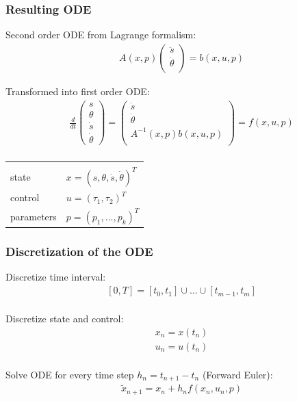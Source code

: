 \begin{frame}[c]
	\frametitle{Resulting ODE}
	
	Second order ODE from Lagrange formalism:
	\begin{align*}
	  &A(x,p)
	  \begin{pmatrix} 
	    \ddot{s} \\ \ddot{\theta} \\
	  \end{pmatrix}
	  = b(x,u,p)
	\end{align*}
	
	Transformed into first order ODE:
	\begin{align*}
	  &\frac{d}{dt}
	  \begin{pmatrix}
	  s \\ \theta \\ \dot{s} \\ \dot{\theta}
	  \end{pmatrix}
	  =
	  \begin{pmatrix}
	    \dot{s} \\ \dot{\theta} \\ A^{-1}(x,p)b(x,u,p) \\
	  \end{pmatrix} 
	  = f(x,u,p) \\
	\end{align*}
	
	\vspace{-1.0cm}
	
	\begin{tabular}{ll}
	  & \\
	  state & $ x = (s,\theta,\dot{s},\dot{\theta})^T $ \\
	  control & $ u = (\tau_1,\tau_2)^T $ \\
	  parameters & $ p = (p_1,...,p_k)^T $ \\
	\end{tabular}
\end{frame}

\begin{frame}
	\frametitle{Discretization of the ODE}
	
	Discretize time interval:
	\begin{align*}
	  &[0,T] = [t_0,t_1] \cup \ldots \cup [t_{m-1},t_m] \\
	\end{align*}
	
	Discretize state and control:
	\begin{align*}
	  &x_n = x(t_n) \\
	  &u_n = u(t_n) \\
	\end{align*}
	
	Solve ODE for every time step $h_n=t_{n+1}-t_n$ (Forward Euler):
	\begin{align*}
	  &\tilde{x}_{n+1} = x_n + h_n f(x_n,u_n,p) \\
	\end{align*}
\end{frame}

